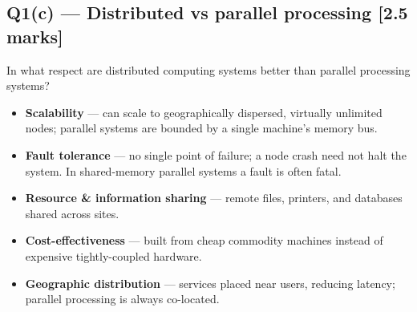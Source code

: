 \documentclass[12pt, a4paper]{article}
\newenvironment{qbox}{\begin{mdframed}[style=qframe]}{\end{mdframed}}
\newenvironment{solbox}{\begin{mdframed}[style=solframe]}{\end{mdframed}}
\newcommand{\qmarks}[1]{\hfill\textbf{\color{orange!70!black}[#1 marks]}}
\begin{document}
\subsection{Q1(c) — Distributed vs parallel processing \texorpdfstring{\qmarks{2.5}}{}}
\begin{qbox}In what respect are distributed computing systems better than parallel processing systems?\end{qbox}
\begin{solbox}
\begin{itemize}[leftmargin=1.4cm, itemsep=3pt]
  \item \textbf{Scalability} — can scale to geographically dispersed, virtually unlimited nodes; parallel systems are bounded by a single machine's memory bus.
  \item \textbf{Fault tolerance} — no single point of failure; a node crash need not halt the system. In shared-memory parallel systems a fault is often fatal.
  \item \textbf{Resource \& information sharing} — remote files, printers, and databases shared across sites.
  \item \textbf{Cost-effectiveness} — built from cheap commodity machines instead of expensive tightly-coupled hardware.
  \item \textbf{Geographic distribution} — services placed near users, reducing latency; parallel processing is always co-located.
\end{itemize}
\end{solbox}

\end{document}
